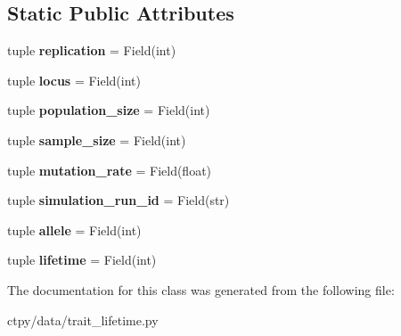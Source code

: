 \subsection*{Static Public Attributes}
\begin{DoxyCompactItemize}
\item 
\hypertarget{classctpy_1_1data_1_1trait__lifetime_1_1_trait_lifetime_record_a34329c77033b3422941b5034210c8ec6}{tuple {\bfseries replication} = Field(int)}\label{classctpy_1_1data_1_1trait__lifetime_1_1_trait_lifetime_record_a34329c77033b3422941b5034210c8ec6}

\item 
\hypertarget{classctpy_1_1data_1_1trait__lifetime_1_1_trait_lifetime_record_abfcbbed46d42754bb88ab176fc271b19}{tuple {\bfseries locus} = Field(int)}\label{classctpy_1_1data_1_1trait__lifetime_1_1_trait_lifetime_record_abfcbbed46d42754bb88ab176fc271b19}

\item 
\hypertarget{classctpy_1_1data_1_1trait__lifetime_1_1_trait_lifetime_record_ab0cd686096450ceb9a9d5333b873cb8a}{tuple {\bfseries population\-\_\-size} = Field(int)}\label{classctpy_1_1data_1_1trait__lifetime_1_1_trait_lifetime_record_ab0cd686096450ceb9a9d5333b873cb8a}

\item 
\hypertarget{classctpy_1_1data_1_1trait__lifetime_1_1_trait_lifetime_record_ae2d69a03e8375928d093599c8752cd95}{tuple {\bfseries sample\-\_\-size} = Field(int)}\label{classctpy_1_1data_1_1trait__lifetime_1_1_trait_lifetime_record_ae2d69a03e8375928d093599c8752cd95}

\item 
\hypertarget{classctpy_1_1data_1_1trait__lifetime_1_1_trait_lifetime_record_a4d1b3124976e2428d1966cfe5cb30f26}{tuple {\bfseries mutation\-\_\-rate} = Field(float)}\label{classctpy_1_1data_1_1trait__lifetime_1_1_trait_lifetime_record_a4d1b3124976e2428d1966cfe5cb30f26}

\item 
\hypertarget{classctpy_1_1data_1_1trait__lifetime_1_1_trait_lifetime_record_a45be5dd9ab144209a493c552b5e2fcf3}{tuple {\bfseries simulation\-\_\-run\-\_\-id} = Field(str)}\label{classctpy_1_1data_1_1trait__lifetime_1_1_trait_lifetime_record_a45be5dd9ab144209a493c552b5e2fcf3}

\item 
\hypertarget{classctpy_1_1data_1_1trait__lifetime_1_1_trait_lifetime_record_aaec42f993041c174518023637ee97bc0}{tuple {\bfseries allele} = Field(int)}\label{classctpy_1_1data_1_1trait__lifetime_1_1_trait_lifetime_record_aaec42f993041c174518023637ee97bc0}

\item 
\hypertarget{classctpy_1_1data_1_1trait__lifetime_1_1_trait_lifetime_record_aa02fc335d053c6e90e2785eb837daf22}{tuple {\bfseries lifetime} = Field(int)}\label{classctpy_1_1data_1_1trait__lifetime_1_1_trait_lifetime_record_aa02fc335d053c6e90e2785eb837daf22}

\end{DoxyCompactItemize}


The documentation for this class was generated from the following file\-:\begin{DoxyCompactItemize}
\item 
ctpy/data/trait\-\_\-lifetime.\-py\end{DoxyCompactItemize}
